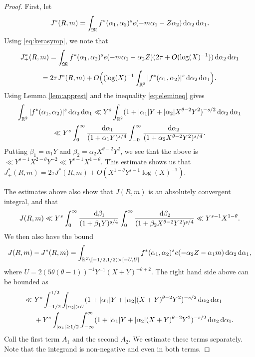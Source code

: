 \documentclass[11pt,reqno]{amsart}
\numberwithin{equation}{section}
\renewcommand{\d}{\,{\rm d}}
\begin{document}
\begin{proof} First, let 
\[ J^*(R,m) = \int_{\mathfrak{M}} f^*(\alpha_1, \alpha_2)^se(-m\alpha_1-Z\alpha_2)\d\alpha_2\d\alpha_1. \]
Using \eqref{eq:kerasymp}, we note that 
\[ J^*_{\pm}(R,m) = \int_{\mathfrak{M}} f^*(\alpha_1,\alpha_2)^se(-m\alpha_1-\alpha_2Z)(2\tau+O(\log(X)^{-1}))\d\alpha_2\d\alpha_1 \] 
\[ = 2\tau J^*(R,m) + O\Big((\log(X)^{-1}\int_{\mathbb{R}^2} |f^*(\alpha_1,\alpha_2)|^s\d\alpha_2\d\alpha_1\Big). \]
Using Lemma \ref{lem:apprest} and the inequality \eqref{eq:elemineq} gives 
\[ \int_{\mathbb{R}^2} |f^*(\alpha_1,\alpha_2)|^s\d\alpha_2\d\alpha_1 \ll Y^s\int_{\mathbb{R}^2} (1+|\alpha_1|Y+|\alpha_2|X^{\theta-2}Y^2)^{-s/2}\d\alpha_2\d\alpha_1 \]
\[ \ll Y^s \int_{0}^{\infty} \frac{\d\alpha_1}{(1+\alpha_1Y)^{s/4}} \int_{-0}^{\infty} \frac{\d\alpha_2}{(1+\alpha_2X^{\theta-2}Y^2)^{s/4}}. \]
Putting $\beta_1 = \alpha_1Y$ and $\beta_2 = \alpha_2X^{\theta-2}Y^2$, we see that the above is $ \ll Y^{s-1}X^{2-\theta}Y^{-2} \ll Y^{s-1}X^{1-\theta}$.
This estimate shows us that $J_{\pm}^*(R,m) = 2\tau J^*(R,m)+O(X^{1-\theta}Y^{s-1}\log(X)^{-1})$. 

The estimates above also show that $J(R,m)$ is an absolutely convergent integral, and that 
\[ J(R,m) \ll Y^s \int_{0}^{\infty} \frac{\d\beta_1}{(1+\beta_1Y)^{s/4}} \int_{0}^{\infty} \frac{\d\beta_2}{(1+\beta_2 X^{\theta-2}Y^2)^{s/4}} \ll Y^{s-1}X^{1-\theta}. \]
We then also have the bound 
\[ J(R,m)-J^*(R,m) = \int_{\mathbb{R}^2 \setminus [-1/2, 1/2) \times [-U, U]} f^*(\alpha_1,\alpha_2)^s e(-\alpha_2Z-\alpha_1m)\d\alpha_2\d\alpha_1, \]
where $U = 2(5\theta(\theta-1))^{-1}Y^{-1}(X+Y)^{-\theta+2}$. The right hand side above can be bounded as 
\begin{align*} \ll & \; Y^s\int_{-1/2}^{1/2} \int_{|\alpha_2| > U} (1+|\alpha_1|Y+|\alpha_2|(X+Y)^{\theta-2}Y^2)^{-s/2}\d\alpha_2\d\alpha_1  \\
& \; + Y^s\int_{|\alpha_1|\geq 1/2} \int_{-\infty}^{\infty} (1+|\alpha_1|Y+|\alpha_2|(X+Y)^{\theta-2}Y^2)^{-s/2}\d\alpha_2\d\alpha_1.  
\end{align*}
Call the first term $A_1$ and the second $A_2$. We estimate these terms separately. Note that the integrand is non-negative and even in both terms. 


\end{proof}
\end{document}
